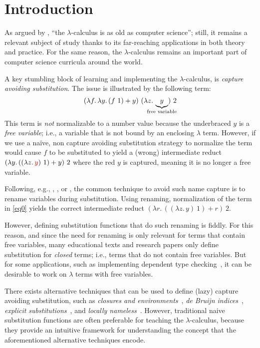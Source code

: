 \section{Introduction}

As argued by \citet{Accattoli19}, ``the $\lambda$-calculus is as old as computer science''; still, it remains a relevant subject of study thanks to its far-reaching applications in both theory and practice.
For the same reason, the $\lambda$-calculus remains an important part of computer science curricula around the world.

A key stumbling block of learning and implementing the $\lambda$-calculus, is \emph{capture avoiding substitution}.
The issue is illustrated by the following term:
\begin{equation}
  (\lambda f .\, \lambda y .\, (f\ 1) + y)\ (\lambda z .\, \underbrace{y}_{\mathclap{\text{free variable}}})\ 2
  \label{eq0}
\end{equation}
This term is \emph{not} normalizable to a number value because the underbraced $y$ is a \emph{free variable}; i.e., a variable that is not bound by an enclosing $\lambda$ term.
However, if we use a na\"{i}ve, non capture avoiding substitution strategy to normalize the term would cause $f$ to be substituted to yield a (wrong) intermediate reduct $(\lambda y .\, ((\lambda z .\, {\color{red} y})\ 1) + y)\ 2$ where the {\color{red} red $y$} is captured, meaning it is no longer a free variable.

Following, e.g., \citet{curry1958combinatory}, \citet{Plotkin75}, or \citet{DBLP:books/daglib/0067558}, the common technique to avoid such name capture is to rename variables during substitution.
Using renaming, normalization of the term in \cref{eq0} yields the correct intermediate reduct $(\lambda r .\, ((\lambda z .\, y)\ 1) + r)\ 2$.

However, defining substitution functions that do such renaming is fiddly.
For this reason, and since the need for renaming is only relevant for terms that contain free variables, many educational texts and research papers only define substitution for \emph{closed} terms; i.e., terms that do not contain free variables.
But for some applications, such as implementing dependent type checking~\citep{Pareto1995ALF}, it can be desirable to work on $\lambda$ terms with free variables.

There exists alternative techniques that can be used to define (lazy) capture avoiding substitution, such as \emph{closures and environments}~\citep{Landin64}, \emph{de Bruijn indices}~\citep{de_Bruijn_1972}, \emph{explicit substitutions}~\citep{AbadiCCL91}, and \emph{locally nameless}~\cite{Chargueraud12}.
However, traditional naive substitution functions are often preferable for teaching the $\lambda$-calculus, because they provide an intuitive framework for understanding the concept that the aforementioned alternative techniques encode.

